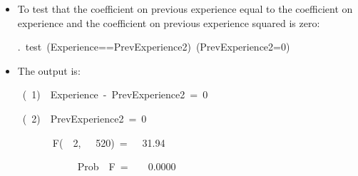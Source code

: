 \documentclass[notes=show,compress,beamer]{beamer}
\begin{document}
\begin{frame}[fragile=singleslide]%


\begin{itemize}
\item To test that the coefficient on previous experience equal to the
coefficient on experience and the coefficient on previous experience squared
is zero:\medskip

.\ test\ (Experience==PrevExperience2)\ (PrevExperience2=0)

\medskip

\item The output is:\medskip

\ (\ 1)\ \ Experience\ -\ PrevExperience2\ =\ 0

\ (\ 2)\ \ PrevExperience2\ =\ 0

\ \ \ \ \ \ \ F(\ \ 2,\ \ \ 520)\ =\ \ \ 31.94

\ \ \ \ \ \ \ \ \ \ \ \ Prob\ \TEXTsymbol{>}\ F\ =\ \ \ \ 0.0000
\end{itemize}

\end{frame}%
\end{document}
